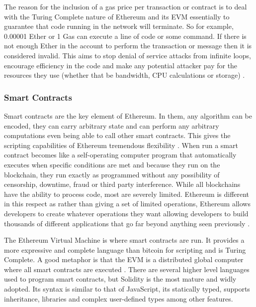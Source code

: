 \documentclass{article}
\begin{document}
The reason for the inclusion of a gas price per transaction or contract is to deal with the Turing Complete nature of Ethereum and its EVM essentially to guarantee that code running in the network will terminate. So for example, 0.00001 Ether or 1 Gas can execute a line of code or some command. If there is not enough Ether in the account to perform the transaction or message then it is considered invalid. This aims to stop denial of service attacks from infinite loops, encourage efficiency in the code and make any potential attacker pay for the resources they use (whether that be bandwidth, CPU calculations or storage) \citep{56_ethereum_2017}.

\cleardoublepage
\subsubsection{Smart Contracts}
\label{sec:SmartContracts}
Smart contracts are the key element of Ethereum. In them, any algorithm can be encoded, they can carry arbitrary state and can perform any arbitrary computations even being able to call other smart contracts. This gives the scripting capabilities of Ethereum tremendous flexibility \citep{59_peyrott_senanayaka_2017}. When run a smart contract becomes like a self-operating computer program that automatically executes when specific conditions are met and because they run on the blockchain, they run exactly as programmed without any possibility of censorship, downtime, fraud or third party interference. While all blockchains have the ability to process code, most are severely limited. Ethereum is different in this respect as rather than giving a set of limited operations, Ethereum allows developers to create whatever operations they want allowing developers to build thousands of different applications that go far beyond anything seen previously \citep{55_what_is_ethereum_a_step-by-step_beginners_guide_2017}.

The Ethereum Virtual Machine is where smart contracts are run. It provides a more expressive and complete language than bitcoin for scripting and is Turing Complete. A good metaphor is that the EVM is a distributed global computer where all smart contracts are executed \citep{58_the_hitchhikers_guide_to_smart_contracts_in_ethereum_2017}. There are several higher level languages used to program smart contracts, but Solidity is the most mature and widly adopted. Its syntax is similar to that of JavaScript, its statically typed, supports inheritance, libraries and complex user-defined types among other features.
\end{document}
